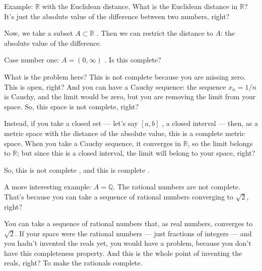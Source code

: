 \begin{speech}[00:55:45 - 00:57:31]
Example:  $\mathbb{R}$ with the Euclidean distance. What is the Euclidean distance in $\mathbb{R}$? It's just the absolute value of the difference between two numbers, right? 

Now, we take a subset $A \subset \mathbb{R}$ . Then we can restrict the distance to $A$: the absolute value of the difference.

Case number one: $A = (0, \infty)$ . Is this complete?

What is the problem here? This is not complete because you are missing zero. This is open, right?  And you can have a Cauchy sequence: the sequence $x_n = 1/n$  is Cauchy, and the limit would be zero, but you are removing the limit from your space. So, this space is not complete, right?

Instead, if you take a closed set --- let's say $[a, b]$ , a closed interval --- then, as a metric space with the distance of the absolute value, this is a complete metric space. When you take a Cauchy sequence, it converges in $\mathbb{R}$, so the limit belongs to $\mathbb{R}$; but since this is a closed interval, the limit will belong to your space, right?
\end{speech}

\begin{speech}[00:57:31 - 00:58:51]
So, this is not complete , and this is complete .

A more interesting example:  $A = \mathbb{Q}$. The rational numbers are not complete. That's because you can take a sequence of rational numbers converging to $\sqrt{2}$, right? 

You can take a sequence of rational numbers that, as real numbers, converges to $\sqrt{2}$. If your space were the rational numbers --- just fractions of integers --- and you hadn't invented the reals yet, you would have a problem, because you don't have this completeness property. And this is the whole point of inventing the reals, right? To make the rationals complete.
\end{speech}

